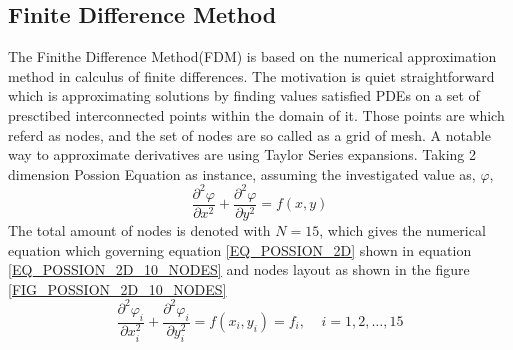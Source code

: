 \subsection{Finite Difference Method}\label{SEC:FDM}
The Finithe Difference Method(FDM) is based on the numerical approximation method in calculus of finite differences.
The motivation is quiet straightforward which is approximating solutions by finding values satisfied PDEs on a set of 
presctibed interconnected points within the domain of it. Those points are which referd as nodes, and the set of nodes 
are so called as a grid of mesh.
A notable way to approximate derivatives are using 
Taylor Series expansions.
Taking 2 dimension Possion Equation as instance, assuming the investigated value as, $\varphi$,
\begin{equation}\label{EQ_POSSION_2D}
  \frac{
    \partial ^ 2 \varphi  
  }{
    \partial x ^ 2
  } +
  \frac{
    \partial ^ 2 \varphi  
  }{
    \partial y ^ 2
  }
  =  f(x,y)
\end{equation}
The total amount of nodes is denoted with $N = 15$, which gives the numerical equation which governing 
equation \ref{EQ_POSSION_2D} 
shown in 
equation \ref{EQ_POSSION_2D_10_NODES} and nodes layout as shown in the 
figure \ref{FIG_POSSION_2D_10_NODES}
\begin{equation}\label{EQ_POSSION_2D_10_NODES}
  \frac{
    \partial ^ 2 \varphi_i
  }{
    \partial x_i ^ 2
  } +
  \frac{
    \partial ^ 2 \varphi_i
  }{
    \partial y_i ^ 2
  }
  =  f(x_i,y_i) = f_i, \:\:\:\:\: i = 1,2,\dots,15
\end{equation}
